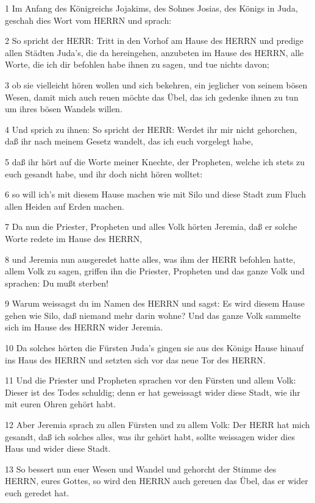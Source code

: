 \par 1 Im Anfang des Königreichs Jojakims, des Sohnes Josias, des Königs in Juda, geschah dies Wort vom HERRN und sprach:
\par 2 So spricht der HERR: Tritt in den Vorhof am Hause des HERRN und predige allen Städten Juda's, die da hereingehen, anzubeten im Hause des HERRN, alle Worte, die ich dir befohlen habe ihnen zu sagen, und tue nichts davon;
\par 3 ob sie vielleicht hören wollen und sich bekehren, ein jeglicher von seinem bösen Wesen, damit mich auch reuen möchte das Übel, das ich gedenke ihnen zu tun um ihres bösen Wandels willen.
\par 4 Und sprich zu ihnen: So spricht der HERR: Werdet ihr mir nicht gehorchen, daß ihr nach meinem Gesetz wandelt, das ich euch vorgelegt habe,
\par 5 daß ihr hört auf die Worte meiner Knechte, der Propheten, welche ich stets zu euch gesandt habe, und ihr doch nicht hören wolltet:
\par 6 so will ich's mit diesem Hause machen wie mit Silo und diese Stadt zum Fluch allen Heiden auf Erden machen.
\par 7 Da nun die Priester, Propheten und alles Volk hörten Jeremia, daß er solche Worte redete im Hause des HERRN,
\par 8 und Jeremia nun ausgeredet hatte alles, was ihm der HERR befohlen hatte, allem Volk zu sagen, griffen ihn die Priester, Propheten und das ganze Volk und sprachen: Du mußt sterben!
\par 9 Warum weissagst du im Namen des HERRN und sagst: Es wird diesem Hause gehen wie Silo, daß niemand mehr darin wohne? Und das ganze Volk sammelte sich im Hause des HERRN wider Jeremia.
\par 10 Da solches hörten die Fürsten Juda's gingen sie aus des Königs Hause hinauf ins Haus des HERRN und setzten sich vor das neue Tor des HERRN.
\par 11 Und die Priester und Propheten sprachen vor den Fürsten und allem Volk: Dieser ist des Todes schuldig; denn er hat geweissagt wider diese Stadt, wie ihr mit euren Ohren gehört habt.
\par 12 Aber Jeremia sprach zu allen Fürsten und zu allem Volk: Der HERR hat mich gesandt, daß ich solches alles, was ihr gehört habt, sollte weissagen wider dies Haus und wider diese Stadt.
\par 13 So bessert nun euer Wesen und Wandel und gehorcht der Stimme des HERRN, eures Gottes, so wird den HERRN auch gereuen das Übel, das er wider euch geredet hat.
